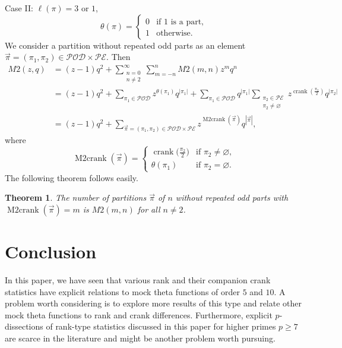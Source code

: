 \documentclass[pdftex]{sigma}
\numberwithin{equation}{section}
\newtheorem{Theorem}{Theorem}[section]
\newcommand\mylabel[1]{\label{#1}}
\begin{document}
Case II: $\ell(\pi) = 3$ or $1$,
\begin{equation*}%
\theta(\pi)=\begin{cases}
0 & \mbox{if $1$ is a part}, \\
1 & \mbox{otherwise.}
\end{cases}
\end{equation*}%
We consider a partition without repeated odd parts as an element
$\vec{\pi}=(\pi_1,\pi_2) \in \mathcal{POD} \times \mathcal{PE}$.
Then
\begin{align*}
M2(z,q)&{}=(z-1)q^2+\sum_{\substack{n=0\\ n\neq 2}}^\infty
\sum_{m=-n}^n  M2(m,n) z^m q^n
\\
&{}=(z-1)q^2+\sum\limits_{\pi_1 \in \mathcal{POD}}z^{\theta(\pi_1)}q^{|\pi_1|}+\sum\limits_{\pi_1 \in \mathcal{POD}}q^{|\pi_1|}\sum\limits_{\substack{\pi_2 \in \mathcal{PE}\\ \pi_2 \neq \varnothing}}z^{\operatorname{crank}(\frac{\pi_2}{2})}q^{|\pi_2|}
\\
&{}=(z-1)q^2+\sum\limits_{\vec{\pi} = (\pi_1,\pi_2) \in \mathcal{POD} \times \mathcal{PE}}z^{\operatorname{M2crank}(\vec{\pi})}q^{|\vec{\pi}|},
\end{align*}
where
\begin{equation*}%
\operatorname{M2crank}(\vec{\pi})=\begin{cases}
\operatorname{crank}\bigl(\frac{\pi_2}{2}\bigr) & \mbox{if $\pi_2 \neq \varnothing$},
\\
\theta(\pi_1) & \mbox{if $\pi_2 = \varnothing$.}
\end{cases}
\end{equation*}%
The following theorem follows easily.
\begin{Theorem}
The number of partitions $\vec{\pi}$ of $n$ without repeated odd parts with $\operatorname{M2crank}(\vec{\pi})=m$ is $M2(m,n)$ for all $n \neq 2$.
\end{Theorem}

\section{Conclusion}

In this paper, we have seen that various rank and their companion crank statistics have explicit relations to mock theta functions of order $5$ and $10$. A problem worth considering is to explore more results of this type and relate other mock theta functions to rank and crank differences. Furthermore, explicit $p$-dissections of rank-type statistics discussed in this paper for higher primes $p \geq 7$ are scarce in the literature and might be another problem worth pursuing.
\end{document}
